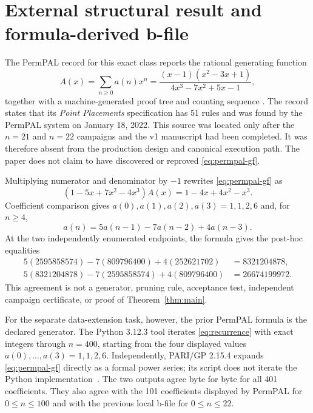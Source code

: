 \documentclass[11pt]{article}
\theoremstyle{definition}
\theoremstyle{remark}
\begin{document}
\section{External structural result and formula-derived b-file}
\label{sec:recurrence}

The PermPAL record for this exact class reports the rational generating
function
\begin{equation}
 A(x)=\sum_{n\geq0}a(n)x^n
 =\frac{(x-1)(x^2-3x+1)}{4x^3-7x^2+5x-1},
 \label{eq:permpal-gf}
\end{equation}
together with a machine-generated proof tree and counting sequence
\cite{albertEtAl2026,permpalA369431Class}.  The record states that its
\emph{Point Placements} specification has 51 rules and was found by the
PermPAL system on January 18, 2022.  This source was located only after
the $n=21$ and $n=22$ campaigns and the v1 manuscript had been completed.
It was therefore absent from the production design and canonical execution
path.  The paper does not claim to have discovered or reproved
\eqref{eq:permpal-gf}.

Multiplying numerator and denominator by $-1$ rewrites
\eqref{eq:permpal-gf} as
\[
 (1-5x+7x^2-4x^3)A(x)=1-4x+4x^2-x^3.
\]
Coefficient comparison gives $a(0),a(1),a(2),a(3)=1,1,2,6$ and, for
$n\geq4$,
\begin{equation}
 a(n)=5a(n-1)-7a(n-2)+4a(n-3).
 \label{eq:recurrence}
\end{equation}
At the two independently enumerated endpoints, the formula gives the
post-hoc equalities
\begin{align*}
5(2595858574)-7(809796400)+4(252621702) &= 8321204878,\\
5(8321204878)-7(2595858574)+4(809796400) &= 26674199972.
\end{align*}
This agreement is not a generator, pruning rule, acceptance test, independent
campaign certificate, or proof of Theorem~\ref{thm:main}.

For the separate data-extension task, however, the prior PermPAL formula is
the declared generator.  The Python 3.12.3 tool
 iterates \eqref{eq:recurrence} with exact
integers through $n=400$, starting from the four displayed values
$a(0),\ldots,a(3)=1,1,2,6$.  Independently, PARI/GP 2.15.4 expands
\eqref{eq:permpal-gf} directly as a formal power series; its script does not
iterate the Python implementation~\cite{pythonDocs,pariGp}.  The two outputs
agree byte for byte for all 401 coefficients.  They also agree with the 101
coefficients displayed by PermPAL for $0\leq n\leq100$ and with the previous
local b-file for $0\leq n\leq22$.
\end{document}
